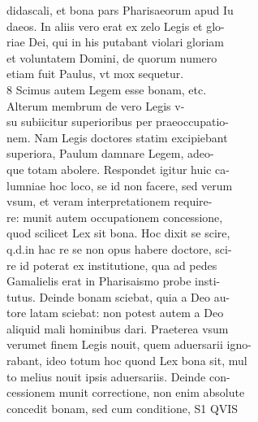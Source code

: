 \documentclass{article}
\begin{document}
\begin{pages}
                didascali, et bona pars Pharisaeorum apud Iu \\
                daeos. In aliis vero erat ex zelo Legis et glo- \\
                riae Dei, qui in his putabant violari gloriam \\
                et voluntatem Domini, de quorum numero \\
                etiam fuit Paulus, vt mox sequetur. \\
                8 Scimus autem Legem esse bonam, etc. \\
                Alterum membrum de vero Legis v- \\
                su subiicitur superioribus per praeoccupatio- \\
                nem. Nam Legis doctores statim excipiebant \\
                superiora, Paulum damnare Legem, adeo- \\
                que totam abolere. Respondet igitur huic ca- \\
                lumniae hoc loco, se id non facere, sed verum \\
                vsum, et veram interpretationem require- \\
                re: munit autem occupationem concessione, \\
                quod scilicet Lex sit bona. Hoc dixit se scire, \\
                q.d.in hac re se non opus habere doctore, sci- \\
                re id poterat ex institutione, qua ad pedes \\
                Gamalielis erat in Pharisaismo probe insti- \\
                tutus. Deinde bonam sciebat, quia a Deo au- \\
                tore latam sciebat: non potest autem a Deo \\
                aliquid mali hominibus dari. Praeterea vsum \\
                verumet finem Legis nouit, quem aduersarii igno- \\
                rabant, ideo totum hoc quond Lex bona sit, mul \\
                to melius nouit ipsis aduersariis. Deinde con- \\
                cessionem munit correctione, non enim absolute \\
                concedit bonam, sed cum conditione, S1 QVIS \\

\end{pages}
\end{document}

